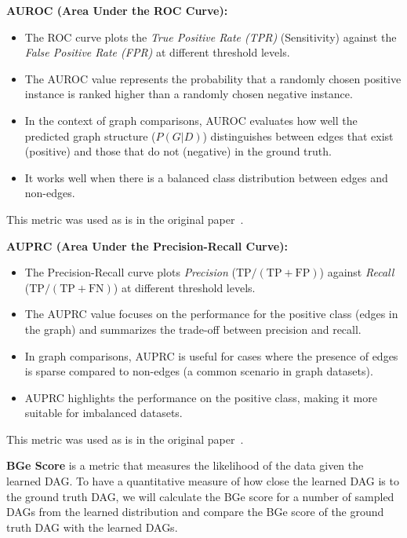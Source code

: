 \documentclass{lxaiproposal}
\begin{document}
    \vspace*{3mm}
    \noindent\textbf{AUROC (Area Under the ROC Curve):}
    \begin{itemize}
        \item The ROC curve plots the \textit{True Positive Rate (TPR)} (Sensitivity) against the \textit{False Positive Rate (FPR)} at different threshold levels.
        \item The AUROC value represents the probability that a randomly chosen positive instance is ranked higher than a randomly chosen negative instance.
        \item In the context of graph comparisons, AUROC evaluates how well the predicted graph structure ($P(G|D)$) distinguishes between edges that exist (positive) and those that do not (negative) in the ground truth.
        \item It works well when there is a balanced class distribution between edges and non-edges.
    \end{itemize}
    This metric was used as is in the original paper~\cite{deleu2022daggflownet}.


    \vspace*{3mm}
    \noindent\textbf{AUPRC (Area Under the Precision-Recall Curve):}
    \begin{itemize}
        \item The Precision-Recall curve plots \textit{Precision} ($\text{TP} / (\text{TP} + \text{FP})$) against \textit{Recall} ($\text{TP} / (\text{TP} + \text{FN})$) at different threshold levels.
        \item The AUPRC value focuses on the performance for the positive class (edges in the graph) and summarizes the trade-off between precision and recall.
        \item In graph comparisons, AUPRC is useful for cases where the presence of edges is sparse compared to non-edges (a common scenario in graph datasets).
        \item AUPRC highlights the performance on the positive class, making it more suitable for imbalanced datasets.
    \end{itemize}
    This metric was used as is in the original paper~\cite{deleu2022daggflownet}.


    \vspace*{3mm}
    \noindent\textbf{BGe Score} is a metric that measures the likelihood of the data given the learned DAG. To have a
    quantitative measure of how close the learned DAG is to the ground truth DAG, we will calculate the BGe score
    for a number of sampled DAGs from the learned distribution and compare the BGe score of the ground truth DAG with
    the learned DAGs.
\end{document}
